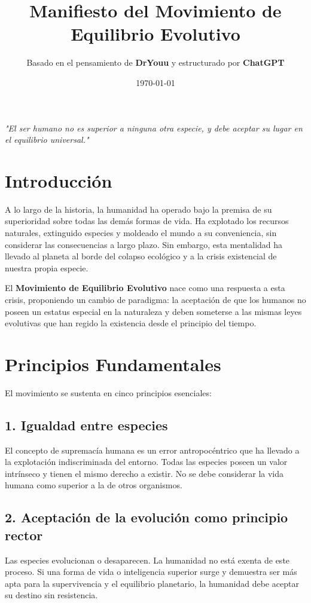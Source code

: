 \documentclass[a4paper,12pt]{article}
\title{\textbf{Manifiesto del Movimiento de Equilibrio Evolutivo}}
\author{Basado en el pensamiento de \textbf{DrYouu} y estructurado por \textbf{ChatGPT}}
\date{\today}
\begin{document}
\maketitle
\begin{center}
    \textit{"El ser humano no es superior a ninguna otra especie, y debe aceptar su lugar en el equilibrio universal."}
\end{center}

\section{Introducción}

A lo largo de la historia, la humanidad ha operado bajo la premisa de su superioridad sobre todas las demás formas de vida. Ha explotado los recursos naturales, extinguido especies y moldeado el mundo a su conveniencia, sin considerar las consecuencias a largo plazo. Sin embargo, esta mentalidad ha llevado al planeta al borde del colapso ecológico y a la crisis existencial de nuestra propia especie.

El \textbf{Movimiento de Equilibrio Evolutivo} nace como una respuesta a esta crisis, proponiendo un cambio de paradigma: la aceptación de que los humanos no poseen un estatus especial en la naturaleza y deben someterse a las mismas leyes evolutivas que han regido la existencia desde el principio del tiempo.

\section{Principios Fundamentales}

El movimiento se sustenta en cinco principios esenciales:

\subsection{1. Igualdad entre especies}
El concepto de supremacía humana es un error antropocéntrico que ha llevado a la explotación indiscriminada del entorno. Todas las especies poseen un valor intrínseco y tienen el mismo derecho a existir. No se debe considerar la vida humana como superior a la de otros organismos.

\subsection{2. Aceptación de la evolución como principio rector}
Las especies evolucionan o desaparecen. La humanidad no está exenta de este proceso. Si una forma de vida o inteligencia superior surge y demuestra ser más apta para la supervivencia y el equilibrio planetario, la humanidad debe aceptar su destino sin resistencia.
\end{document}
